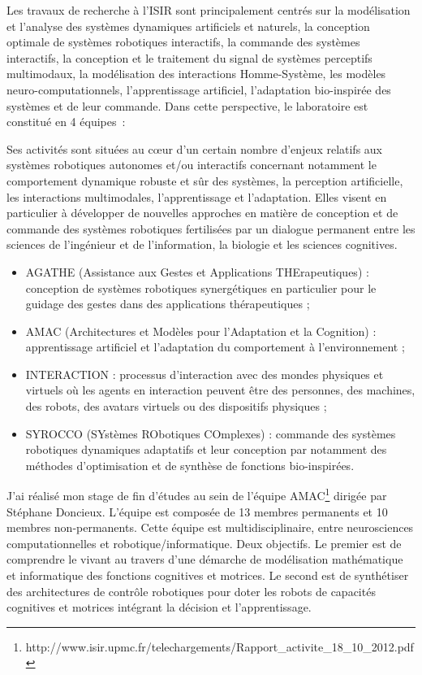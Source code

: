 \documentclass[draft]{llncs}
\begin{document}
Les travaux de recherche à l'ISIR sont principalement centrés sur la modélisation et l'analyse des systèmes dynamiques artificiels et naturels, la conception optimale de systèmes robotiques interactifs, la commande des systèmes interactifs, la conception et le traitement du signal de systèmes perceptifs multimodaux, la modélisation des interactions Homme-Système, les modèles neuro-computationnels, l'apprentissage artificiel, l'adaptation bio-inspirée des systèmes et de leur commande. Dans cette perspective, le laboratoire est constitué en 4 équipes~:

Ses activités sont situées au cœur d’un certain nombre d’enjeux relatifs aux systèmes robotiques autonomes et/ou interactifs concernant notamment le comportement dynamique robuste et sûr des systèmes, la perception artificielle, les interactions multimodales, l’apprentissage et l’adaptation.
Elles visent en particulier à développer de nouvelles approches en matière de conception et de commande des systèmes robotiques fertilisées par un dialogue permanent entre les sciences de l’ingénieur et de l’information, la biologie et les sciences cognitives.

\begin{itemize}
\item AGATHE (Assistance aux Gestes et Applications THErapeutiques) : conception de systèmes robotiques synergétiques en particulier pour le guidage des gestes dans des applications thérapeutiques ;
\item AMAC (Architectures et Modèles pour l'Adaptation et la Cognition) : apprentissage artificiel et l’adaptation du comportement à l’environnement ;
\item INTERACTION : processus d’interaction avec des mondes physiques et virtuels où les agents en interaction peuvent être des personnes, des machines, des robots, des avatars virtuels ou des dispositifs physiques ;
\item SYROCCO (SYstèmes RObotiques COmplexes) : commande des systèmes robotiques dynamiques adaptatifs et leur conception par notamment des méthodes d’optimisation et de synthèse de fonctions bio-inspirées.
\end{itemize}

J'ai réalisé mon stage de fin d'études au sein de l'équipe AMAC\footnote{http://www.isir.upmc.fr/telechargements/Rapport\_activite\_18\_10\_2012.pdf} dirigée par Stéphane Doncieux.
L'équipe est composée de 13 membres permanents et 10 membres non-permanents.
Cette équipe est multidisciplinaire, entre neurosciences computationnelles et robotique/informatique.
Deux objectifs. 
Le premier est de comprendre le vivant au travers d’une démarche de modélisation mathématique et informatique des fonctions cognitives et motrices.
Le second est de synthétiser des architectures de contrôle robotiques pour doter les robots de capacités cognitives et motrices intégrant la décision et l’apprentissage.
\end{document}
